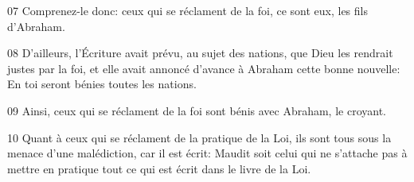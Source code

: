 
07 Comprenez-le donc: ceux qui se réclament de la foi, ce sont eux, les fils d’Abraham.

08 D’ailleurs, l’Écriture avait prévu, au sujet des nations, que Dieu les rendrait justes par la foi, et elle avait annoncé d’avance à Abraham cette bonne nouvelle: En toi seront bénies toutes les nations.

09 Ainsi, ceux qui se réclament de la foi sont bénis avec Abraham, le croyant.

10 Quant à ceux qui se réclament de la pratique de la Loi, ils sont tous sous la menace d’une malédiction, car il est écrit: Maudit soit celui qui ne s’attache pas à mettre en pratique tout ce qui est écrit dans le livre de la Loi.
